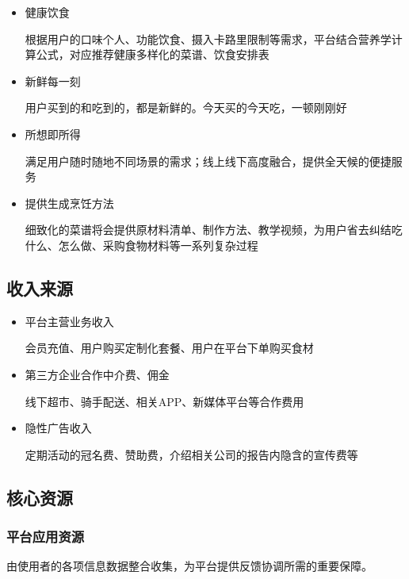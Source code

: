 \documentclass[UTF8,12pt]{ctexart}
\numberwithin{figure}{section}%
\begin{document}
\begin{spacing}{2}
\begin{itemize}
	\item 健康饮食
	
	根据用户的口味个人、功能饮食、摄入卡路里限制等需求，平台结合营养学计算公式，对应推荐健康多样化的菜谱、饮食安排表
	
	\item 新鲜每一刻
	
	用户买到的和吃到的，都是新鲜的。今天买的今天吃，一顿刚刚好
	
	\item 所想即所得
	
	满足用户随时随地不同场景的需求；线上线下高度融合，提供全天候的便捷服务
	
	\item 提供生成烹饪方法
	
	细致化的菜谱将会提供原材料清单、制作方法、教学视频，为用户省去纠结吃什么、怎么做、采购食物材料等一系列复杂过程
	
	
\end{itemize}

\subsection{收入来源}

\begin{itemize}
	\item 平台主营业务收入
	
	会员充值、用户购买定制化套餐、用户在平台下单购买食材
	
	\item 第三方企业合作中介费、佣金
	
	线下超市、骑手配送、相关APP、新媒体平台等合作费用
	
	\item 隐性广告收入
	
	定期活动的冠名费、赞助费，介绍相关公司的报告内隐含的宣传费等 
	
\end{itemize}

\subsection{核心资源}
\subsubsection{平台应用资源}

由使用者的各项信息数据整合收集，为平台提供反馈协调所需的重要保障。


\end{spacing}
\end{document}
